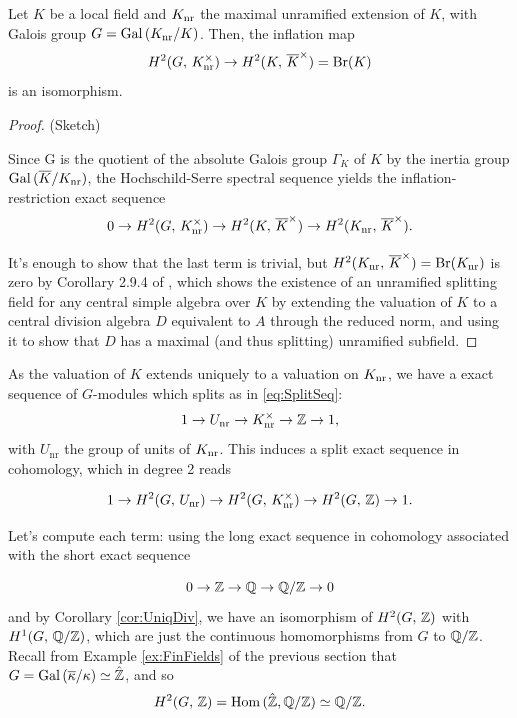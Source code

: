 \documentclass[a4paper, oneside]{memoir}
\begin{document}
\begin{proposition}
    Let $K$ be a local field and $K_{\text{nr}}$ the maximal unramified extension of $K$, with Galois group $G=\operatorname{Gal}{(K_{\text{nr}}/K)}$. Then, the inflation map
    \[
        H^{2}( G, \, K_{\text{nr}}^\times )\to H^{2}( K, \, \overline{K}^\times )= \mathrm{Br}(K)
    \]
    is an isomorphism.

\end{proposition}

\begin{proof}{(Sketch)}

    Since G is the quotient of the absolute Galois group $\Gamma_K$ of $K$ by the inertia group $\operatorname{Gal}{(\overline{K}/K_{\text{nr}})}$, the Hochschild-Serre spectral sequence yields the inflation-restriction exact sequence
    \[
        0\to H^{2}( G, \, K_{\text{nr}}^\times )\to H^{2}( K, \, \overline{K}^\times )\to H^{2}( K_{\text{nr}}, \, \overline{K}^\times ).
    \]

    It's enough to show that the last term is trivial, but $H^{2}( K_{\text{nr}}, \, \overline{K}^\times )=\mathrm{Br}(K_{\text{nr}})$ is zero by Corollary 2.9.4 of \cite{SzamuelyGille}, which shows the existence of an unramified splitting field for any central simple algebra over $K$ by extending the valuation of $K$ to a central division algebra $D$ equivalent to $A$ through the reduced norm, and using it to show that $D$ has a maximal (and thus splitting) unramified subfield.
\end{proof}

As the valuation of $K$ extends uniquely to a valuation on $K_{\text{nr}}$, we have a exact sequence of $G$-modules which splits as in \eqref{eq:SplitSeq}:
\[
    1\to U_{\text{nr}} \to K_{\text{nr}}^\times\to\mathbb{Z}\to 1,
\]
with $U_{\text{nr}}$ the group of units of $K_{\text{nr}}$. This induces a split exact sequence in cohomology, which in degree 2 reads

\begin{equation}\label{eq:BrSeq}
    1\to H^{2}( G, \, U_{\text{nr}} )\to H^{2}( G, \, K_{\text{nr}}^\times )\to H^{2}( G, \, \mathbb{Z} )\to 1.
\end{equation}

Let's compute each term: using the long exact sequence in cohomology associated with the short exact sequence

\[
    0\to\mathbb{Z}\to\mathbb{Q}\to\mathbb{Q}/\mathbb{Z}\to 0
\]
and by Corollary \ref{cor:UniqDiv}, we have an isomorphism of $H^{2}( G, \, \mathbb{Z} )$ with $H^{1}( G, \, \mathbb{Q}/\mathbb{Z} )$, which are just the continuous homomorphisms from $G$ to $\mathbb{Q}/\mathbb{Z}$. Recall from Example
\ref{ex:FinFields} of the previous
section that $G=\operatorname{Gal}{(\overline{\kappa}/\kappa)}\simeq\hat{\mathbb{Z}}$, and so
\[
    H^{2}( G, \, \mathbb{Z} )=\operatorname{Hom}{(\hat{\mathbb{Z}},\mathbb{Q}/\mathbb{Z})}\simeq\mathbb{Q}/\mathbb{Z}.
\]
\end{document}

